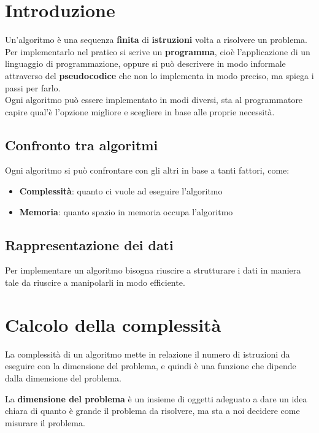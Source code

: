 \documentclass[a4paper]{article}
\begin{document}


\tableofcontents
\pagebreak

\section{Introduzione}
Un'algoritmo è una sequenza \textbf{finita} di \textbf{istruzioni} volta a risolvere un problema.
Per implementarlo nel pratico si scrive un \textbf{programma}, cioè l'applicazione di
un linguaggio di programmazione, oppure si può descrivere in modo informale
attraverso del \textbf{pseudocodice} che non lo implementa in modo preciso,
ma spiega i passi per farlo.
\\
Ogni algoritmo può essere implementato in modi diversi, sta al programmatore
capire qual'è l'opzione migliore e scegliere in base alle proprie necessità.

\subsection{Confronto tra algoritmi}
Ogni algoritmo si può confrontare con gli altri in base a tanti fattori, come:
\begin{itemize}
  \item \textbf{Complessità}: quanto ci vuole ad eseguire l'algoritmo
  \item \textbf{Memoria}: quanto spazio in memoria occupa l'algoritmo
\end{itemize}

\subsection{Rappresentazione dei dati}
Per implementare un algoritmo bisogna riuscire a strutturare i dati in maniera tale
da riuscire a manipolarli in modo efficiente.

\section{Calcolo della complessità}
La complessità di un algoritmo mette in relazione il numero di istruzioni da eseguire
con la dimensione del problema, e quindi è una funzione che dipende dalla dimensione
del problema.

\vspace{1em}
\noindent
La \textbf{dimensione del problema} è un insieme di oggetti adeguato a dare un idea
chiara di quanto è grande il problema da risolvere, ma sta a noi decidere come
misurare il problema.
\end{document}

